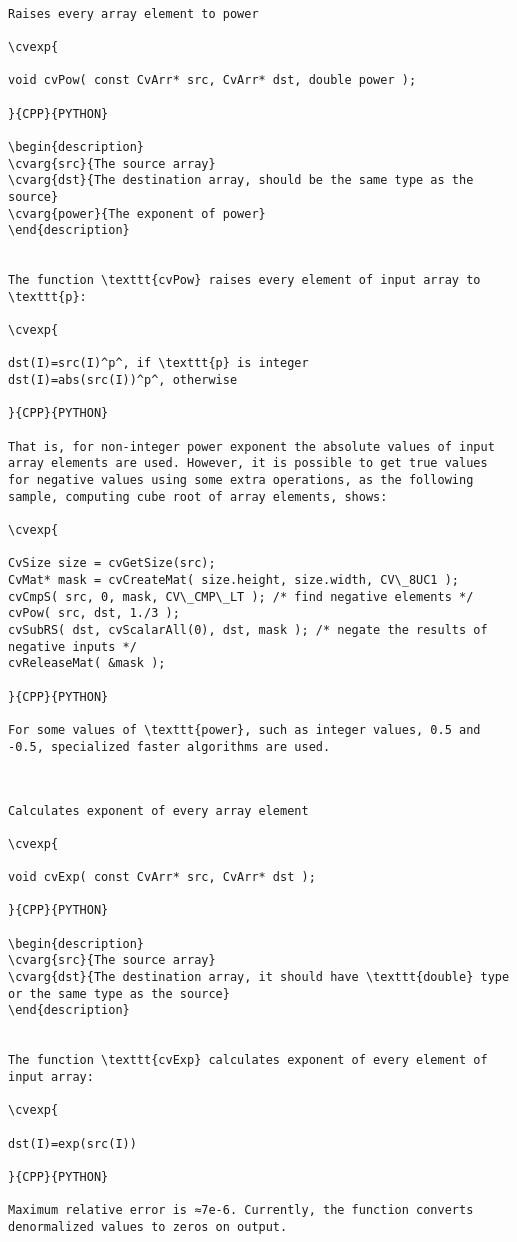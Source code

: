 \begin{verbatim}

Raises every array element to power

\cvexp{

void cvPow( const CvArr* src, CvArr* dst, double power );

}{CPP}{PYTHON}

\begin{description}
\cvarg{src}{The source array}
\cvarg{dst}{The destination array, should be the same type as the source}
\cvarg{power}{The exponent of power}
\end{description}


The function \texttt{cvPow} raises every element of input array to \texttt{p}:

\cvexp{

dst(I)=src(I)^p^, if \texttt{p} is integer
dst(I)=abs(src(I))^p^, otherwise

}{CPP}{PYTHON}

That is, for non-integer power exponent the absolute values of input array elements are used. However, it is possible to get true values for negative values using some extra operations, as the following sample, computing cube root of array elements, shows:

\cvexp{

CvSize size = cvGetSize(src);
CvMat* mask = cvCreateMat( size.height, size.width, CV\_8UC1 );
cvCmpS( src, 0, mask, CV\_CMP\_LT ); /* find negative elements */
cvPow( src, dst, 1./3 );
cvSubRS( dst, cvScalarAll(0), dst, mask ); /* negate the results of negative inputs */
cvReleaseMat( &mask );

}{CPP}{PYTHON}

For some values of \texttt{power}, such as integer values, 0.5 and -0.5, specialized faster algorithms are used.


\end{verbatim}
\begin{verbatim}

Calculates exponent of every array element

\cvexp{

void cvExp( const CvArr* src, CvArr* dst );

}{CPP}{PYTHON}

\begin{description}
\cvarg{src}{The source array}
\cvarg{dst}{The destination array, it should have \texttt{double} type or the same type as the source}
\end{description}


The function \texttt{cvExp} calculates exponent of every element of input array:

\cvexp{

dst(I)=exp(src(I))

}{CPP}{PYTHON}

Maximum relative error is ≈7e-6. Currently, the function converts denormalized values to zeros on output.


\end{verbatim}

